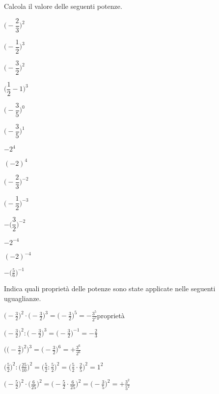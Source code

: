 \begin{esercizio}
 \label{ese:3.56}
Calcola il valore delle seguenti potenze.
\begin{multicols}{4}
\begin{enumeratea}
\spazielenx
 \item $\bigg(-\dfrac{2}{3}\bigg)^2$
 \item $\bigg(-\dfrac{1}{2}\bigg)^3$
 \item $\bigg(-\dfrac{3}{2}\bigg)^2$
 \item $\bigg(\dfrac{1}{2}-1\bigg)^3$
 \item $\bigg(-\dfrac{3}{5}\bigg)^0$
 \item $\bigg(-\dfrac{3}{5}\bigg)^1$
 \item $-2^4$
 \item $(-2)^4$
 \item $\bigg(-\dfrac{2}{3}\bigg)^{-2}$
 \item $\bigg(-\dfrac{1}{2}\bigg)^{-3}$
 \item $-\bigg(\dfrac{3}{2}\bigg)^{-2}$
 \item $-2^{-4}$
 \item $(-2)^{-4}$
 \item $-\bigg(\frac{5}{6}\bigg)^{-1}$
\end{enumeratea}
\end{multicols}
\end{esercizio}

\begin{esercizio}
 \label{ese:3.57}
Indica quali proprietà delle potenze sono state applicate nelle seguenti 
uguaglianze.
\begin{enumeratea}
\spazielenx
 \item $\displaystyle{\bigg(-\frac{3}{2}\bigg)^2\cdot\bigg(-\frac{3}{2}
 \bigg)^{3}=%
\bigg(-\frac{3}{2}\bigg)^{5}=-\frac{3^5}{2^5}}$\qquad proprietà \
 \item $\displaystyle{\bigg(-\frac{3}{2}\bigg)^2:\bigg(-\frac{3}{2}\bigg)^{3}=
 \bigg(-\frac{3}{2}\bigg)^{-1}=%
-\frac{2}{3}}$
 \item $\displaystyle{\bigg(\bigg(-\frac{3}{2}\bigg)^2\bigg)^3=
 \bigg(-\frac{3}{2}\bigg)^{6}=%
+\frac{3^6}{2^6}}$
 \item $\displaystyle{\bigg(\frac{5}{2}\bigg)^2:\bigg(\frac{25}{10}\bigg)^2=
 \bigg(\frac{5}{2}:\frac{5}{2}\bigg)^2=%
\bigg(\frac{5}{2}\cdot\frac{2}{5}\bigg)^2=1^2}$
 \item $\displaystyle{\bigg(-\frac{5}{2}\bigg)^{2}\cdot\bigg(\frac{6}{25}
 \bigg)^{2}=\bigg(-\frac{5}{2}\cdot%
\frac{6}{25}\bigg)^{2}=\bigg(-\frac{3}{5}\bigg)^2=+\frac{3^2}{5^2}}$
\end{enumeratea}
\end{esercizio}

